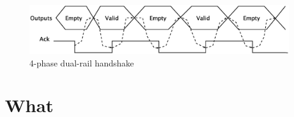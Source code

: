 \documentclass[a4paper,10pt]{article}
\begin{document}
\begin{figure}[H] 
\centering
\includegraphics[scale=.3]{4phase_dual_rail.eps}
\caption{4-phase dual-rail handshake\cite[Page 13]{bible}} \label{fig:in3}
\end{figure}





\section{What}



\end{document}
